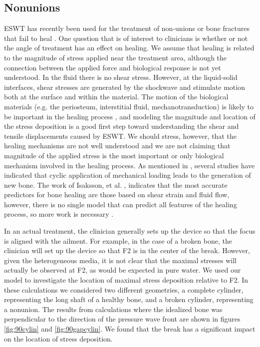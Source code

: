 \documentclass{article}
\begin{document}
\subsection{Nonunions}
\label{sec:cylinders}
ESWT has recently been used for the treatment of non-unions or bone
fractures that fail to heal \cite{eswt_bone}.  One question that
is of interest to clinicians is whether or not the angle of treatment
has an effect on healing.  We assume that healing is related to the
magnitude of stress  applied near the treatment area, although the
connection between the applied force and biological response is not
yet understood.  
In the fluid there is no shear stress.
However, at the liquid-solid interfaces, shear stresses are generated
by the shockwave and stimulate motion both at the surface and within
the material.  The motion of the biological materials (e.g. the
periosteum, interstitial fluid, mechanotransduction) is likely to be important in the
healing process \cite{frangos, prendergast1997, weinbaum1994, claes1999, isaksson2006,park1998,turner1998}, and modeling
the magnitude and location of the stress deposition is a good first
step toward understanding the shear and tensile displacements caused by ESWT.  
We should stress, however, that the healing mechanisms are not well
understood and we are not claiming that magnitude of the applied
stress is the most important or only biological mechanism involved
in the healing process.  As mentioned in , several studies
have indicated that cyclic application of mechanical loading leads to the generation
of new bone.  The work of Isaksson, et al. \cite{isaksson2006}, indicates that the most accurate
predictors for bone healing are those based on shear strain and fluid flow, however, there is no 
single model that can predict all features of the healing process, so more work is necessary \cite{morgan2008}.

In an actual treatment, the clinician generally sets up the device so that the focus is aligned with the ailment.  For example, in the case of a broken bone, the clinician will set up the device so that F2 is in the center of the break.  However, given the heterogeneous media, it is not clear that the maximal stresses will actually be observed at F2, as would be expected in pure water.  We used our model to investigate the location of maximal stress deposition relative to F2.  In these calculations we considered two different geometries, a complete cylinder, representing the long shaft of a healthy bone, and a broken cylinder, representing a nonunion.  The results from calculations where the idealized bone was perpendicular to the direction of the pressure wave front are shown in figures \ref{fig:90cylin} and \ref{fig:90gapcylin}.  We found that the break has a significant impact on the location of stress deposition.  
\end{document}

